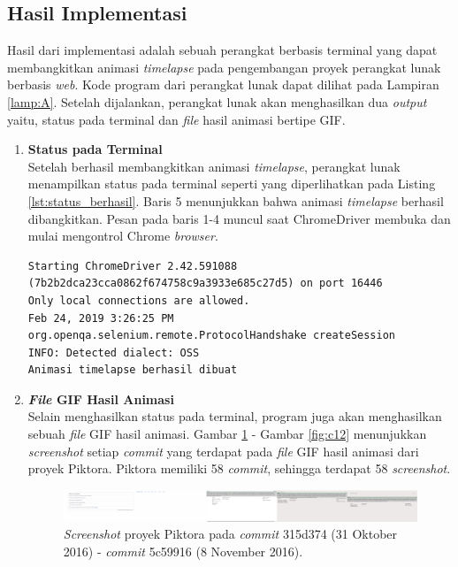 \subsection{Hasil Implementasi}
\label{subsec:lingkunganimplementasi}
Hasil dari implementasi adalah sebuah perangkat berbasis terminal yang dapat membangkitkan animasi \textit{timelapse} pada pengembangan proyek perangkat lunak berbasis \textit{web}. Kode program dari perangkat lunak dapat dilihat pada Lampiran \ref{lamp:A}. Setelah dijalankan, perangkat lunak akan menghasilkan dua \textit{output} yaitu, status pada terminal dan \textit{file} hasil animasi bertipe GIF.
\begin{enumerate}
\item \textbf{Status pada Terminal}\\
Setelah berhasil membangkitkan animasi \textit{timelapse}, perangkat lunak menampilkan status pada terminal seperti yang diperlihatkan pada Listing \ref{lst:status_berhasil}. Baris 5 menunjukkan bahwa animasi \textit{timelapse} berhasil dibangkitkan. Pesan pada baris 1-4 muncul saat ChromeDriver membuka dan mulai mengontrol Chrome \textit{browser}.

\begin{lstlisting}[caption={Status pesan pada terminal saat program berhasil membangkitkan animasi \textit{timelapse}.},label={lst:status_berhasil},language=plaintext]
Starting ChromeDriver 2.42.591088 (7b2b2dca23cca0862f674758c9a3933e685c27d5) on port 16446
Only local connections are allowed.
Feb 24, 2019 3:26:25 PM org.openqa.selenium.remote.ProtocolHandshake createSession
INFO: Detected dialect: OSS
Animasi timelapse berhasil dibuat
\end{lstlisting}

\item \textbf{\textit{File} GIF Hasil Animasi}\\
Selain menghasilkan status pada terminal, program juga akan menghasilkan sebuah \textit{file} GIF hasil animasi.
Gambar \ref{fig:c1} - Gambar \ref{fig:c12} menunjukkan \textit{screenshot} setiap \textit{commit} yang terdapat pada \textit{file} GIF hasil animasi dari proyek Piktora. Piktora memiliki 58 \textit{commit}, sehingga terdapat 58 \textit{screenshot}. 

\begin{figure}[H]
	
		\includegraphics[scale=0.3]{Gambar/Untitled-1.png}
	\caption{\textit{Screenshot} proyek Piktora pada \textit{commit} 315d374 (31 Oktober 2016) - \textit{commit} 5c59916 (8 November 2016).}
	\label{fig:c1}
\end{figure}



\end{enumerate}
